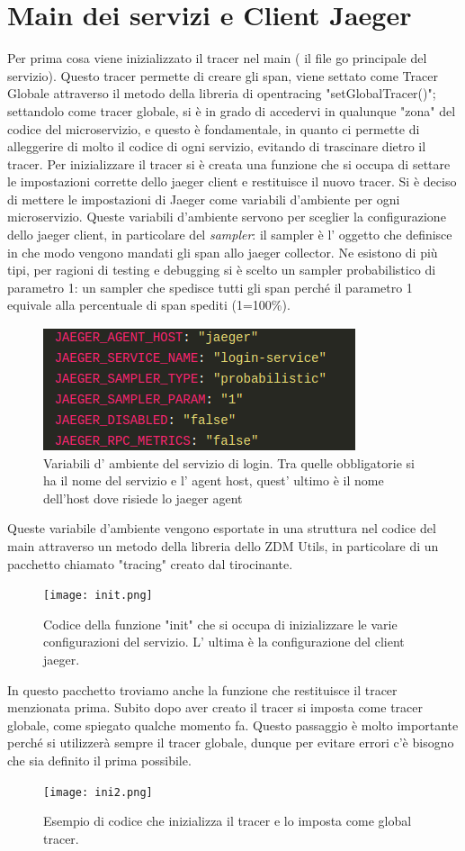 \documentclass[a4paper,12pt,titlepage,italian,openany]{report}
\begin{document}
\section{Main dei servizi e Client Jaeger}
Per prima cosa viene inizializzato il tracer nel main ( il file go principale del servizio). Questo tracer permette di creare gli span, viene settato come Tracer Globale attraverso il metodo della libreria di opentracing "setGlobalTracer()"; settandolo come tracer globale, si è in grado di accedervi in qualunque "zona" del codice del microservizio, e questo è fondamentale, in quanto ci permette di alleggerire
di molto il codice di ogni servizio, evitando di trascinare dietro il tracer. Per inizializzare il tracer si è creata una funzione che si occupa di settare le impostazioni corrette dello jaeger client e restituisce il nuovo tracer. Si è deciso di mettere le impostazioni
di Jaeger come variabili d'ambiente per ogni microservizio. Queste variabili d'ambiente servono per sceglier la configurazione dello jaeger client, in particolare del \textit{sampler}: il sampler è l' oggetto che definisce in che modo vengono mandati gli span allo jaeger collector. Ne esistono di più tipi, per ragioni di testing e debugging si è scelto un sampler probabilistico
 di parametro 1: un sampler che spedisce tutti gli span perché il parametro 1 equivale alla percentuale di span spediti (1=100\%). 
\begin{figure}[H]
    \includegraphics[scale=0.5]{envvar.png}
    \centering
    \caption{Variabili d' ambiente del servizio di login. Tra quelle obbligatorie si ha il nome del servizio e l' agent host, quest' ultimo è il nome dell'host dove risiede lo jaeger agent}
\end{figure}

Queste variabile d'ambiente vengono esportate in una struttura nel codice del main attraverso un metodo della libreria dello ZDM\cite{zdm:1} Utils, in particolare di un pacchetto chiamato "tracing" creato dal tirocinante.
\begin{figure}[H]
    \texttt{[image: init.png]}
    \centering
    \caption{Codice della funzione "init" che si occupa di inizializzare le varie configurazioni del servizio. L' ultima è la configurazione del client jaeger.}
\end{figure}
In questo pacchetto troviamo anche la funzione che restituisce il tracer menzionata prima.
Subito dopo aver creato il tracer si imposta come tracer globale, come spiegato qualche momento fa. Questo passaggio è molto importante perché si utilizzerà sempre il tracer globale,
dunque per evitare errori c'è bisogno che sia definito il prima possibile.
\begin{figure}[H]
    \centering
    \texttt{[image: ini2.png]}
    \caption{Esempio di codice che inizializza il tracer e lo imposta come global tracer.}
\end{figure}
\end{document}
